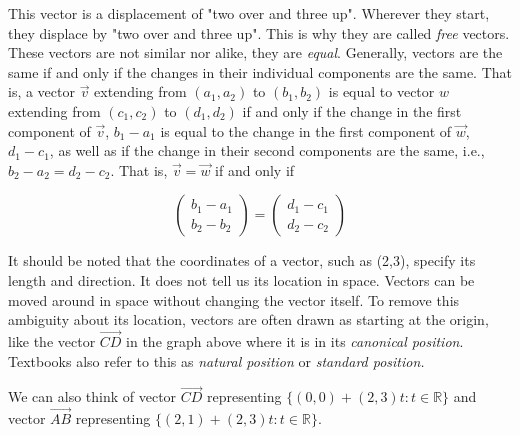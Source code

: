 \documentclass[11pt]{amsart} %
\theoremstyle{plain}
\theoremstyle{definition}
\theoremstyle{definition}
\theoremstyle{remark}
\theoremstyle{definition}
\begin{document}
\medskip

This vector is a displacement of "two over and three up". Wherever they start, they displace by "two over and three up". This is why they are called \emph{free} vectors. These vectors are not similar nor alike, they are \emph{equal}. Generally, vectors are the same if and only if the changes in their individual components are the same. That is, a vector $\vec{v}$ extending from $(a_1, a_2)$ to $(b_1, b_2)$ is equal to vector $w$ extending from $(c_1, c_2)$ to $(d_1, d_2)$ if and only if the change in the first component of $\vec{v}$, $b_1 - a_1$ is equal to the change in the first component of $\vec{w}$, $d_1 - c_1$, as well as if the change in their second components are the same, i.e., $b_2 - a_2 = d_2 - c_2$. That is, $\vec{v} = \vec{w}$ if and only if

\begin{displaymath}
    \begin{pmatrix}
          b_1 - a_1 \\
          b_2 - b_2
    \end{pmatrix}
=
    \begin{pmatrix}
        d_1 - c_1 \\
        d_2 - c_2
    \end{pmatrix}
\end{displaymath}

\medskip
It should be noted that the coordinates of a vector, such as (2,3), specify its length and direction. It does not tell us its location in space. Vectors can be moved around in space without changing the vector itself. To remove this ambiguity about its location, vectors are often drawn as starting at the origin, like the vector $\overrightarrow{CD}$ in the graph above where it is in its \emph{canonical position}. Textbooks also refer to this as \emph{natural position} or \emph{standard position.}

We can also think of vector $\overrightarrow{CD}$ representing $\{(0,0) + (2,3)t : t\in\mathbb{R}\}$ and vector $\overrightarrow{AB}$ representing $\{(2,1) + (2,3)t : t\in\mathbb{R}\}$.
\end{document}
